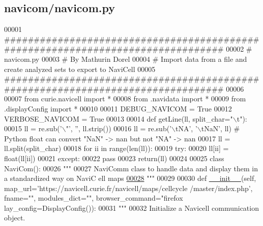 \hypertarget{navicom_8py_source}{
\subsection{navicom/navicom.py}
}

\begin{DoxyCode}
00001 \textcolor{comment}{################################################################################}
00002 \textcolor{comment}{# navicom.py}
00003 \textcolor{comment}{# By Mathurin Dorel}
00004 \textcolor{comment}{# Import data from a file and create analyzed sets to export to NaviCell}
00005 \textcolor{comment}{################################################################################}
00006 
00007 \textcolor{keyword}{from} curie.navicell \textcolor{keyword}{import} *
00008 \textcolor{keyword}{from} .navidata \textcolor{keyword}{import} *
00009 \textcolor{keyword}{from} .displayConfig \textcolor{keyword}{import} *
00010 
00011 DEBUG\_NAVICOM = \textcolor{keyword}{True}
00012 VERBOSE\_NAVICOM = \textcolor{keyword}{True}
00013 
00014 \textcolor{keyword}{def }getLine(ll, split\_char="\(\backslash\)t"):
00015     ll = re.sub(\textcolor{stringliteral}{'\(\backslash\)"'}, \textcolor{stringliteral}{''}, ll.strip())
00016     ll = re.sub(\textcolor{stringliteral}{'\(\backslash\)tNA'}, \textcolor{stringliteral}{'\(\backslash\)tNaN'}, ll) \textcolor{comment}{# Python float can convert "NaN" -> nan but 
      not "NA" -> nan}
00017     ll = ll.split(split\_char)
00018     \textcolor{keywordflow}{for} ii \textcolor{keywordflow}{in} range(len(ll)):
00019         \textcolor{keywordflow}{try}:
00020             ll[ii] = float(ll[ii])
00021         \textcolor{keywordflow}{except}:
00022             \textcolor{keywordflow}{pass}
00023     \textcolor{keywordflow}{return}(ll)
00024 
00025 \textcolor{keyword}{class }NaviCom():
00026     \textcolor{stringliteral}{"""}
00027 \textcolor{stringliteral}{    NaviComm class to handle data and display them in a standardized way on NaviC
      ell maps}
\hypertarget{navicom_8py_source_l00028}{}\hyperlink{classnavicom_1_1navicom_1_1NaviCom}{00028} \textcolor{stringliteral}{    """}
00029 
00030     \textcolor{keyword}{def }\hyperlink{classnavicom_1_1navicom_1_1NaviCom_ae6133fe7ec63cf5643c1794f4f8e2349}{__init__}(self, map\_url='https://navicell.curie.fr/navicell/maps/cellcycle
      /master/index.php\textcolor{stringliteral}{', fname="", modules\_dict="", browser\_command="firefox %
      lay\_config=DisplayConfig()):}
00031 \textcolor{stringliteral}{        }\textcolor{stringliteral}{"""}
00032 \textcolor{stringliteral}{        Initialize a Navicell communication object.}

\end{DoxyCode}
